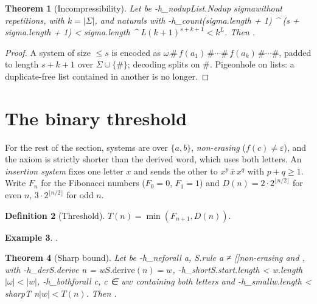 \documentclass[11pt]{article}
\newtheorem{theorem}{Theorem}
\theoremstyle{definition}
\newtheorem{definition}[theorem]{Definition}
\newtheorem{example}[theorem]{Example}
\theoremstyle{remark}
\begin{document}
\begin{theorem}[Incompressibility]
Let  be \hyp{h_nodup}{List.Nodup sigma}{without repetitions},
with $k=|\Sigma|$, and  naturals with
\hyp{h_count}{(sigma.length + 1) ^ (s + sigma.length + 1) < sigma.length ^ L}{$(k+1)^{s+k+1}<k^L$}.
Then .
\end{theorem}
\begin{proof}
A system of size $\le s$ is encoded as $\omega\,\#\,f(a_1)\,\#\cdots\#\,f(a_k)\,\#\cdots\#$,
padded to length $s+k+1$ over $\Sigma\cup\{\#\}$; decoding splits on $\#$. Pigeonhole on
lists: a duplicate-free list contained in another is no longer.
\end{proof}

\section{The binary threshold}

For the rest of the section, systems are over $\{a,b\}$, \emph{non-erasing} ($f(c)\ne\varepsilon$),
and the axiom is strictly shorter than the derived word, which uses both letters.
An \emph{insertion system} fixes one letter $x$ and sends the other to $x^p\,\bar x\,x^q$ with
$p+q\ge1$. Write $F_n$ for the Fibonacci numbers ($F_0=0$, $F_1=1$) and
$D(n)=2\cdot2^{\lfloor n/2\rfloor}$ for even $n$, $3\cdot2^{\lfloor n/2\rfloor}$ for odd $n$.

\begin{definition}[Threshold]
$T(n)=\min(F_{n+1},D(n))$.
\end{definition}

\begin{example}
.
\end{example}

\begin{theorem}[Sharp bound]
Let  be \hyp{h_ne}{forall a, S.rule a ≠ []}{non-erasing} and
,  with \hyp{h_der}{S.derive n = w}{$S.\mathrm{derive}(n)=w$},
\hyp{h_short}{S.start.length < w.length}{$|\omega|<|w|$},
\hyp{h_both}{forall c, c ∈ w}{$w$ containing both letters} and
\hyp{h_small}{w.length < sharpT n}{$|w|<T(n)$}. Then
.
\end{theorem}
\end{document}
